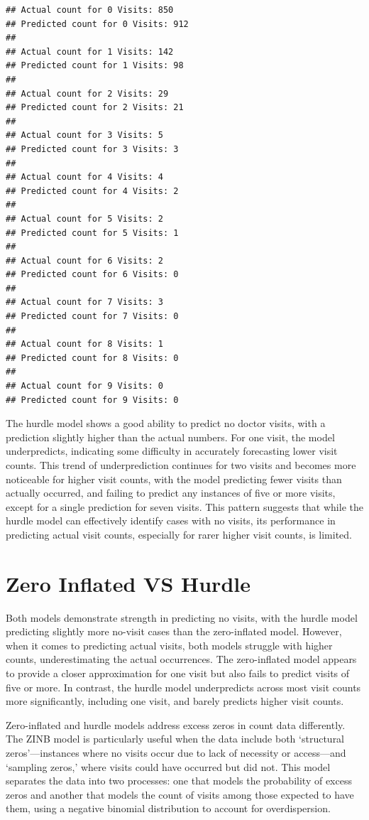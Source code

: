 \documentclass[
]{article}
\begin{document}
\begin{verbatim}
## Actual count for 0 Visits: 850 
## Predicted count for 0 Visits: 912 
## 
## Actual count for 1 Visits: 142 
## Predicted count for 1 Visits: 98 
## 
## Actual count for 2 Visits: 29 
## Predicted count for 2 Visits: 21 
## 
## Actual count for 3 Visits: 5 
## Predicted count for 3 Visits: 3 
## 
## Actual count for 4 Visits: 4 
## Predicted count for 4 Visits: 2 
## 
## Actual count for 5 Visits: 2 
## Predicted count for 5 Visits: 1 
## 
## Actual count for 6 Visits: 2 
## Predicted count for 6 Visits: 0 
## 
## Actual count for 7 Visits: 3 
## Predicted count for 7 Visits: 0 
## 
## Actual count for 8 Visits: 1 
## Predicted count for 8 Visits: 0 
## 
## Actual count for 9 Visits: 0 
## Predicted count for 9 Visits: 0
\end{verbatim}

The hurdle model shows a good ability to predict no doctor visits, with
a prediction slightly higher than the actual numbers. For one visit, the
model underpredicts, indicating some difficulty in accurately
forecasting lower visit counts. This trend of underprediction continues
for two visits and becomes more noticeable for higher visit counts, with
the model predicting fewer visits than actually occurred, and failing to
predict any instances of five or more visits, except for a single
prediction for seven visits. This pattern suggests that while the hurdle
model can effectively identify cases with no visits, its performance in
predicting actual visit counts, especially for rarer higher visit
counts, is limited.

\section{Zero Inflated VS Hurdle}\label{zero-inflated-vs-hurdle}

Both models demonstrate strength in predicting no visits, with the
hurdle model predicting slightly more no-visit cases than the
zero-inflated model. However, when it comes to predicting actual visits,
both models struggle with higher counts, underestimating the actual
occurrences. The zero-inflated model appears to provide a closer
approximation for one visit but also fails to predict visits of five or
more. In contrast, the hurdle model underpredicts across most visit
counts more significantly, including one visit, and barely predicts
higher visit counts.

Zero-inflated and hurdle models address excess zeros in count data
differently. The ZINB model is particularly useful when the data include
both `structural zeros'---instances where no visits occur due to lack of
necessity or access---and `sampling zeros,' where visits could have
occurred but did not. This model separates the data into two processes:
one that models the probability of excess zeros and another that models
the count of visits among those expected to have them, using a negative
binomial distribution to account for overdispersion.
\end{document}
